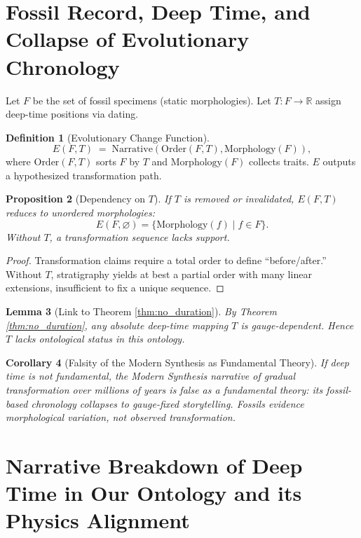 \documentclass[11pt]{article}
\theoremstyle{definition}
\newtheorem{definition}{Definition}[section]
\theoremstyle{plain}
\newtheorem{lemma}[definition]{Lemma}
\newtheorem{proposition}[definition]{Proposition}
\newtheorem{corollary}[definition]{Corollary}
\theoremstyle{remark}
\begin{document}
\section{Fossil Record, Deep Time, and Collapse of Evolutionary Chronology}
Let $F$ be the set of fossil specimens (static morphologies). Let $T:F\to\mathbb{R}$ assign deep-time positions via dating.

\begin{definition}[Evolutionary Change Function]
\[
E(F,T) \;=\; \text{Narrative}(\text{Order}(F,T), \text{Morphology}(F)),
\]
where $\text{Order}(F,T)$ sorts $F$ by $T$ and $\text{Morphology}(F)$ collects traits. $E$ outputs a hypothesized transformation path.
\end{definition}

\begin{proposition}[Dependency on $T$]
If $T$ is removed or invalidated, $E(F,T)$ reduces to unordered morphologies:
\[
E(F,\varnothing) = \{ \text{Morphology}(f) \mid f\in F\}.
\]
Without $T$, a transformation sequence lacks support.
\end{proposition}

\begin{proof}
Transformation claims require a total order to define ``before/after.'' Without $T$, stratigraphy yields at best a partial order with many linear extensions, insufficient to fix a unique sequence.
\end{proof}

\begin{lemma}[Link to Theorem \ref{thm:no_duration}]
By Theorem \ref{thm:no_duration}, any absolute deep-time mapping $T$ is gauge-dependent. Hence $T$ lacks ontological status in this ontology.
\end{lemma}

\begin{corollary}[Falsity of the Modern Synthesis as Fundamental Theory]
If deep time is not fundamental, the Modern Synthesis narrative of gradual transformation over millions of years is false as a fundamental theory: its fossil-based chronology collapses to gauge-fixed storytelling. Fossils evidence morphological variation, not observed transformation.
\end{corollary}

\section{Narrative Breakdown of Deep Time in Our Ontology and its Physics Alignment}
\end{document}
